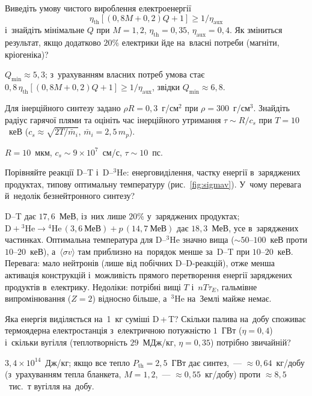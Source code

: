 \begin{problem}\label{prb:NetElectricity}
	Виведіть умову чистого вироблення електроенергії
	\[
		\eta_{\mathrm{th}}[(0{,}8M+0{,}2)Q+1]\geq1/\eta_{\mathrm{aux}}
	\]
	і~знайдіть мінімальне
	$Q$ при $M=1{,}2$, $\eta_{\mathrm{th}}=0{,}35$, $\eta_{\mathrm{aux}}=0{,}4$. Як
	зміниться результат, якщо додатково $20\%$ електрики йде на~власні потреби (магніти,
	кріогеніка)?
	\begin{solution}
		$Q_{\min}\approx5{,}3$; з~урахуванням власних потреб умова стає
	$0{,}8\,\eta_{\mathrm{th}}[(0{,}8M+0{,}2)Q+1]\geq1/\eta_{\mathrm{aux}}$, звідки $Q_{\min}\approx6{,}8$.
	\end{solution}
\end{problem}

\begin{problem}\label{prb:ICFHotSpot}
	Для інерційного синтезу задано $\rho R=0{,}3$~г/см$^2$ при $\rho=300$~г/см$^3$. Знайдіть радіус
	гарячої плями та оцініть час інерційного утримання $\tau\sim R/c_s$ при $T=10$~кеВ
	($c_s\approx\sqrt{2T/\bar m_i}$, $\bar m_i=2{,}5\,m_p$).
	\begin{solution}
		$R=10$~мкм, $c_s\sim9\times10^{7}$~см/с, $\tau\sim10$~пс.
	\end{solution}
\end{problem}

\begin{problem}\label{prb:DTvsDHe}
	Порівняйте реакції D--T і~D--$^3$He: енерговиділення, частку енергії в~заряджених продуктах,
	типову оптимальну температуру (рис.~\ref{fig:sigmav}). У~чому перевага й~недолік безнейтронного синтезу?
	\begin{solution}
		D--T дає $17{,}6$~МеВ, із~них лише $20\%$ у~заряджених продуктах;
	$\mathrm D+{}^3\mathrm{He}\to{}^4\mathrm{He}\,(3{,}6~\text{МеВ})+p\,(14{,}7~\text{МеВ})$ дає $18{,}3$~МеВ,
	усе в~заряджених частинках. Оптимальна температура для D--$^3$He значно вища
	($\sim50$--$100$~кеВ проти $10$--$20$~кеВ), а~$\langle\sigma v\rangle$ там приблизно на~порядок менше
	за~D--T при $10$--$20$~кеВ. Перевага: мало нейтронів (лише від побічних D--D-реакцій), отже менша
	активація конструкцій і~можливість прямого перетворення енергії заряджених продуктів в~електрику.
	Недоліки: потрібні вищі $T$ і~$nT\tau_E$, гальмівне випромінювання ($Z=2$) відносно більше,
	а~$^3$He на~Землі майже немає.
	\end{solution}
\end{problem}

\begin{problem}\label{prb:FuelConsumption}
	Яка енергія виділяється на~1~кг суміші D\,+\,T? Скільки палива на~добу споживає
	термоядерна електростанція з~електричною потужністю $1$~ГВт ($\eta=0{,}4$) і~скільки
	вугілля (теплотворність $29$~МДж/кг, $\eta=0{,}35$) потрібно звичайній?
	\begin{solution}
		$3{,}4\times10^{14}$~Дж/кг; якщо все тепло $P_{\mathrm{th}}=2{,}5$~ГВт дає синтез,~---
	$\approx0{,}64$~кг/добу (з~урахуванням тепла бланкета, $M=1{,}2$,~--- $\approx0{,}55$~кг/добу) проти
	$\approx8{,}5$~тис.~т вугілля на~добу.
	\end{solution}
\end{problem}

